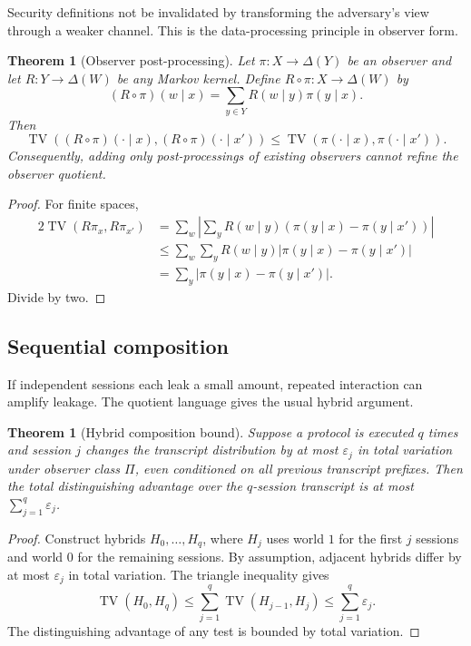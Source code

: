 \documentclass[11pt]{article}
\theoremstyle{definition}
\theoremstyle{plain}
\newtheorem{theorem}[definition]{Theorem}
\theoremstyle{remark}
\DeclareMathOperator{\TV}{TV}
\newcommand{\DeltaS}{\Delta}
\newcommand{\eps}{\varepsilon}
\begin{document}
Security definitions not be invalidated by transforming the adversary's view through a weaker channel. This is the data-processing principle in observer form.

\begin{theorem}[Observer post-processing]
Let $\pi:X\to\DeltaS(Y)$ be an observer and let $R:Y\to\DeltaS(W)$ be any Markov kernel. Define $R\circ\pi:X\to\DeltaS(W)$ by
\[
    (R\circ\pi)(w\mid x)=\sum_{y\in Y}R(w\mid y)\pi(y\mid x).
\]
Then
\[
    \TV((R\circ\pi)(\cdot\mid x),(R\circ\pi)(\cdot\mid x'))\le \TV(\pi(\cdot\mid x),\pi(\cdot\mid x')).
\]
Consequently, adding only post-processings of existing observers cannot refine the observer quotient.
\end{theorem}

\begin{proof}
For finite spaces,
\[
\begin{aligned}
2\TV(R\pi_x,R\pi_{x'})
&=\sum_w\left|\sum_y R(w\mid y)(\pi(y\mid x)-\pi(y\mid x'))\right|\\
&\le \sum_w\sum_y R(w\mid y)|\pi(y\mid x)-\pi(y\mid x')|\\
&=\sum_y |\pi(y\mid x)-\pi(y\mid x')|.
\end{aligned}
\]
Divide by two.
\end{proof}

\subsection{Sequential composition}

If independent sessions each leak a small amount, repeated interaction can amplify leakage. The quotient language gives the usual hybrid argument.

\begin{theorem}[Hybrid composition bound]
Suppose a protocol is executed $q$ times and session $j$ changes the transcript distribution by at most $\eps_j$ in total variation under observer class $\Pi$, even conditioned on all previous transcript prefixes. Then the total distinguishing advantage over the $q$-session transcript is at most $\sum_{j=1}^{q}\eps_j$.
\end{theorem}

\begin{proof}
Construct hybrids $H_0,\ldots,H_q$, where $H_j$ uses world $1$ for the first $j$ sessions and world $0$ for the remaining sessions. By assumption, adjacent hybrids differ by at most $\eps_j$ in total variation. The triangle inequality gives
\[
    \TV(H_0,H_q)\le\sum_{j=1}^{q}\TV(H_{j-1},H_j)\le\sum_{j=1}^{q}\eps_j.
\]
The distinguishing advantage of any test is bounded by total variation.
\end{proof}
\end{document}
